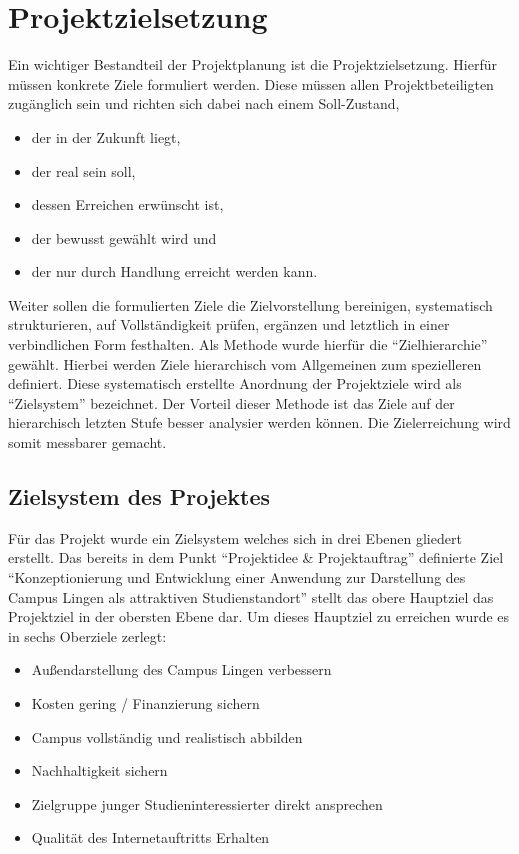 \section{Projektzielsetzung}
\label{sec:Projektzielsetzung}

Ein wichtiger Bestandteil der Projektplanung ist die Projektzielsetzung. Hierfür
müssen konkrete Ziele formuliert werden. Diese müssen allen Projektbeteiligten
zugänglich sein und richten sich dabei nach einem Soll-Zustand,

\begin{itemize}
  \item der in der Zukunft liegt,
  \item der real sein soll,
  \item dessen Erreichen erwünscht ist,
  \item der bewusst gewählt wird und
  \item der nur durch Handlung erreicht werden kann.
\end{itemize}

Weiter sollen die formulierten Ziele die Zielvorstellung bereinigen,
systematisch strukturieren, auf Vollständigkeit prüfen, ergänzen und letztlich
in einer verbindlichen Form festhalten.  Als Methode wurde hierfür die
"`Zielhierarchie"' gewählt. Hierbei werden Ziele hierarchisch vom Allgemeinen zum
spezielleren definiert.  Diese systematisch erstellte Anordnung der
Projektziele wird als "`Zielsystem"' bezeichnet. Der Vorteil dieser Methode ist
das Ziele auf der hierarchisch letzten Stufe besser analysier werden können.
Die Zielerreichung wird somit messbarer gemacht.

\subsection{Zielsystem des Projektes}
\label{sec:Zielsystem}

Für das Projekt wurde ein Zielsystem welches sich in drei Ebenen gliedert
erstellt. Das bereits in dem Punkt "`Projektidee \& Projektauftrag"' definierte
Ziel "`Konzeptionierung und Entwicklung einer Anwendung zur Darstellung des
Campus Lingen als attraktiven Studienstandort"' stellt das obere Hauptziel das
Projektziel in der obersten Ebene dar. Um dieses Hauptziel zu erreichen wurde
es in sechs Oberziele zerlegt:

\begin{itemize}
  \item Außendarstellung des Campus Lingen verbessern
  \item Kosten gering / Finanzierung sichern
  \item Campus vollständig und realistisch abbilden
  \item Nachhaltigkeit sichern
  \item Zielgruppe junger Studieninteressierter direkt ansprechen
  \item Qualität des Internetauftritts Erhalten
\end{itemize}

